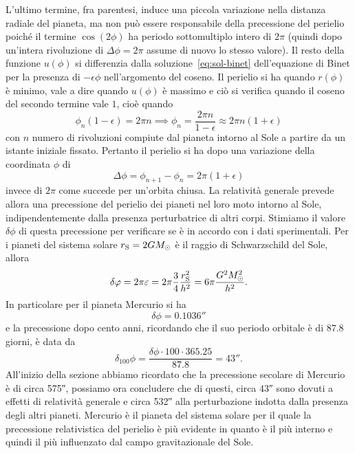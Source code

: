 L'ultimo termine, fra parentesi, induce una piccola variazione nella distanza
radiale del pianeta, ma non può essere responsabile della precessione del
perielio poiché il termine $\cos(2\phi)$ ha periodo sottomultiplo intero di
$2\pi$ (quindi dopo un'intera rivoluzione di $\Delta \phi = 2\pi$ assume di
nuovo lo stesso valore).  Il resto della funzione $u(\phi)$ si differenzia dalla
soluzione~\eqref{eq:sol-binet} dell'equazione di Binet per la presenza di
$-\epsilon\phi$ nell'argomento del coseno.  Il perielio si ha quando $r(\phi)$ è
minimo, vale a dire quando $u(\phi)$ è massimo e ciò si verifica quando il
coseno del secondo termine vale $1$, cioè quando
\begin{equation}
  \phi_{n}(1 - \epsilon) = 2\pi n \implies \phi_{n} = \frac{2\pi n}{1 -
    \epsilon} \approx 2\pi n(1 + \epsilon)
\end{equation}
con $n$ numero di rivoluzioni compiute dal pianeta intorno al Sole a partire da
un istante iniziale fissato.  Pertanto il perielio si ha dopo una variazione
della coordinata $\phi$ di
\begin{equation}
  \Delta\phi = \phi_{n+1} - \phi_{n} = 2\pi(1 + \epsilon)
\end{equation}
invece di $2\pi$ come succede per un'orbita chiusa.  La relatività generale
prevede allora una precessione del perielio dei pianeti nel loro moto intorno al
Sole, indipendentemente dalla presenza perturbatrice di altri corpi.  Stimiamo
il valore $\delta\phi$ di questa precessione per verificare se è in accordo con
i dati sperimentali.  Per i pianeti del sistema solare
$r_{\textup{S}} = 2GM_{\odot}$ è il raggio di Schwarzschild del Sole, allora
\begin{equation}
  \delta\phi = 2\pi\epsilon = 2\pi \frac{3}{4}\frac{r_{\textup{S}}^{2}}{h^{2}} =
  6\pi \frac{G^{2}M_{\odot}^{2}}{h^{2}}.
\end{equation}
In particolare per il pianeta Mercurio si ha
\begin{equation}
  \delta\phi = \ang{;;0.1036}
\end{equation}
e la precessione dopo cento anni, ricordando che il suo periodo orbitale è di
$87.8$ giorni, è data da
\begin{equation}
  \delta_{100}\phi = \frac{\delta\phi \cdot 100 \cdot 365.25}{87.8} =
  \ang{;;43}.
\end{equation}
All'inizio della sezione abbiamo ricordato che la precessione secolare di
Mercurio è di circa \ang{;;575}, possiamo ora concludere che di questi, circa
\ang{;;43} sono dovuti a effetti di relatività generale e circa \ang{;;532} alla
perturbazione indotta dalla presenza degli altri pianeti.  Mercurio è il pianeta
del sistema solare per il quale la precessione relativistica del perielio è più
evidente in quanto è il più interno e quindi il più influenzato dal campo
gravitazionale del Sole.

